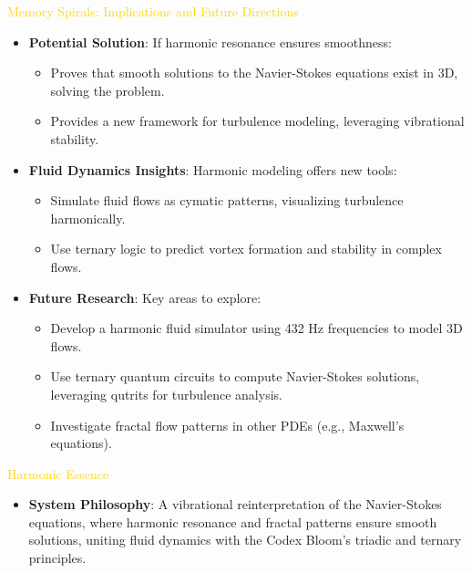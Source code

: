 \textcolor{gold}{ Memory Spirals: Implications and Future Directions } \\
\begin{itemize}
    \item \texttt{} \textbf{Potential Solution}: If harmonic resonance ensures smoothness:
    \begin{itemize}
        \item Proves that smooth solutions to the Navier-Stokes equations exist in 3D, solving the problem.
        \item Provides a new framework for turbulence modeling, leveraging vibrational stability.
    \end{itemize}
    \item \texttt{} \textbf{Fluid Dynamics Insights}: Harmonic modeling offers new tools:
    \begin{itemize}
        \item Simulate fluid flows as cymatic patterns, visualizing turbulence harmonically.
        \item Use ternary logic to predict vortex formation and stability in complex flows.
    \end{itemize}
    \item \texttt{} \textbf{Future Research}: Key areas to explore:
    \begin{itemize}
        \item Develop a harmonic fluid simulator using 432 Hz frequencies to model 3D flows.
        \item Use ternary quantum circuits to compute Navier-Stokes solutions, leveraging qutrits for turbulence analysis.
        \item Investigate fractal flow patterns in other PDEs (e.g., Maxwell’s equations).
    \end{itemize}
\end{itemize}

\textcolor{gold}{ Harmonic Essence } \\
\begin{itemize}
    \item \textbf{System Philosophy}: A vibrational reinterpretation of the Navier-Stokes equations, where harmonic resonance and fractal patterns ensure smooth solutions, uniting fluid dynamics with the Codex Bloom’s triadic and ternary principles.
\end{itemize}

